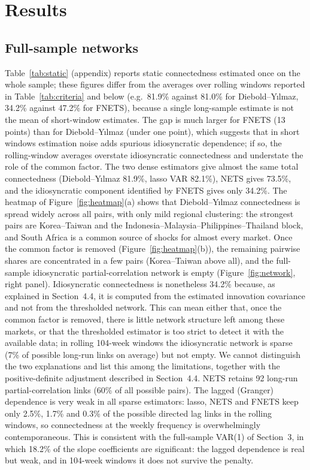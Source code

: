 \section{Results}\label{sec:results}

\subsection{Full-sample networks}
Table~\ref{tab:static} (appendix) reports static connectedness estimated once on the whole sample; these figures differ from the averages over rolling windows reported in Table~\ref{tab:criteria} and below (e.g.\ 81.9\% against 81.0\% for Diebold--Y{\i}lmaz, 34.2\% against 47.2\% for FNETS), because a single long-sample estimate is not the mean of short-window estimates. The gap is much larger for FNETS (13 points) than for Diebold--Y{\i}lmaz (under one point), which suggests that in short windows estimation noise adds spurious idiosyncratic dependence; if so, the rolling-window averages overstate idiosyncratic connectedness and understate the role of the common factor. The two dense estimators give almost the same total connectedness (Diebold--Y{\i}lmaz 81.9\%, lasso VAR 82.1\%), NETS gives 73.5\%, and the idiosyncratic component identified by FNETS gives only 34.2\%. The heatmap of Figure~\ref{fig:heatmap}(a) shows that Diebold--Y{\i}lmaz connectedness is spread widely across all pairs, with only mild regional clustering: the strongest pairs are Korea--Taiwan and the Indonesia--Malaysia--Philippines--Thailand block, and South Africa is a common source of shocks for almost every market. Once the common factor is removed (Figure~\ref{fig:heatmap}(b)), the remaining pairwise shares are concentrated in a few pairs (Korea--Taiwan above all), and the full-sample idiosyncratic partial-correlation network is empty (Figure~\ref{fig:network}, right panel). Idiosyncratic connectedness is nonetheless 34.2\% because, as explained in Section~4.4, it is computed from the estimated innovation covariance and not from the thresholded network. This can mean either that, once the common factor is removed, there is little network structure left among these markets, or that the thresholded estimator is too strict to detect it with the available data; in rolling 104-week windows the idiosyncratic network is sparse (7\% of possible long-run links on average) but not empty. We cannot distinguish the two explanations and list this among the limitations, together with the positive-definite adjustment described in Section~4.4. NETS retains 92 long-run partial-correlation links (60\% of all possible pairs). The lagged (Granger) dependence is very weak in all sparse estimators: lasso, NETS and FNETS keep only 2.5\%, 1.7\% and 0.3\% of the possible directed lag links in the rolling windows, so connectedness at the weekly frequency is overwhelmingly contemporaneous. This is consistent with the full-sample VAR(1) of Section~3, in which 18.2\% of the slope coefficients are significant: the lagged dependence is real but weak, and in 104-week windows it does not survive the penalty.

